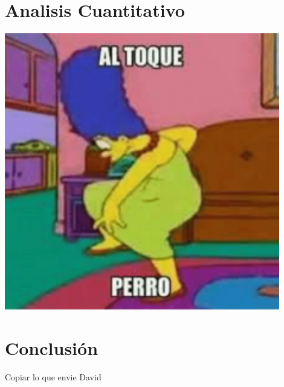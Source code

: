 \documentclass[12pt]{exam}
\newenvironment{Figura}
  {\par\medskip\noindent\minipage{\linewidth}}
  {\endminipage\par\medskip}
\begin{document}
\begin{multicols}{2}
\section{Analisis Cuantitativo}
\begin{Figura}
    \centering
    \includegraphics[width=0.9\textwidth]{../Al_toque_perro.png}
    \label{fig}
\end{Figura}
\section{Conclusión}
Copiar lo que envie David
\end{multicols}
\end{document}
